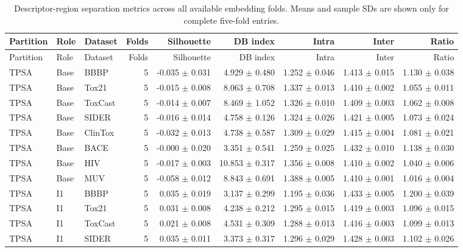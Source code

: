 \begin{landscape}
\begin{longtable}{lllrrrrrr}
\caption{Descriptor-region separation metrics across all available embedding folds. Means and sample SDs are shown only for complete five-fold entries.}
\label{tab:si-embedding-all}\\
\toprule
Partition & Role & Dataset & Folds & Silhouette & DB index & Intra & Inter & Ratio \\
\midrule
\endfirsthead
\toprule
Partition & Role & Dataset & Folds & Silhouette & DB index & Intra & Inter & Ratio \\
\midrule
\endhead
TPSA & Base & BBBP & 5 & -0.035 $\pm$ 0.031 & 4.929 $\pm$ 0.480 & 1.252 $\pm$ 0.046 & 1.413 $\pm$ 0.015 & 1.130 $\pm$ 0.038 \\
TPSA & Base & Tox21 & 5 & -0.015 $\pm$ 0.008 & 8.063 $\pm$ 0.708 & 1.337 $\pm$ 0.013 & 1.410 $\pm$ 0.002 & 1.055 $\pm$ 0.011 \\
TPSA & Base & ToxCast & 5 & -0.014 $\pm$ 0.007 & 8.469 $\pm$ 1.052 & 1.326 $\pm$ 0.010 & 1.409 $\pm$ 0.003 & 1.062 $\pm$ 0.008 \\
TPSA & Base & SIDER & 5 & -0.016 $\pm$ 0.014 & 4.758 $\pm$ 0.126 & 1.324 $\pm$ 0.026 & 1.421 $\pm$ 0.005 & 1.073 $\pm$ 0.024 \\
TPSA & Base & ClinTox & 5 & -0.032 $\pm$ 0.013 & 4.738 $\pm$ 0.587 & 1.309 $\pm$ 0.029 & 1.415 $\pm$ 0.004 & 1.081 $\pm$ 0.021 \\
TPSA & Base & BACE & 5 & -0.000 $\pm$ 0.020 & 3.351 $\pm$ 0.541 & 1.259 $\pm$ 0.025 & 1.432 $\pm$ 0.010 & 1.138 $\pm$ 0.030 \\
TPSA & Base & HIV & 5 & -0.017 $\pm$ 0.003 & 10.853 $\pm$ 0.317 & 1.356 $\pm$ 0.008 & 1.410 $\pm$ 0.002 & 1.040 $\pm$ 0.006 \\
TPSA & Base & MUV & 5 & -0.058 $\pm$ 0.012 & 8.843 $\pm$ 0.691 & 1.388 $\pm$ 0.005 & 1.410 $\pm$ 0.001 & 1.016 $\pm$ 0.004 \\
TPSA & I1 & BBBP & 5 & 0.035 $\pm$ 0.019 & 3.137 $\pm$ 0.299 & 1.195 $\pm$ 0.036 & 1.433 $\pm$ 0.005 & 1.200 $\pm$ 0.039 \\
TPSA & I1 & Tox21 & 5 & 0.031 $\pm$ 0.008 & 4.238 $\pm$ 0.212 & 1.295 $\pm$ 0.015 & 1.419 $\pm$ 0.003 & 1.096 $\pm$ 0.015 \\
TPSA & I1 & ToxCast & 5 & 0.021 $\pm$ 0.008 & 4.531 $\pm$ 0.309 & 1.288 $\pm$ 0.013 & 1.416 $\pm$ 0.003 & 1.099 $\pm$ 0.013 \\
TPSA & I1 & SIDER & 5 & 0.035 $\pm$ 0.011 & 3.373 $\pm$ 0.317 & 1.296 $\pm$ 0.029 & 1.428 $\pm$ 0.003 & 1.102 $\pm$ 0.026 \\

\end{longtable}
\end{landscape}
